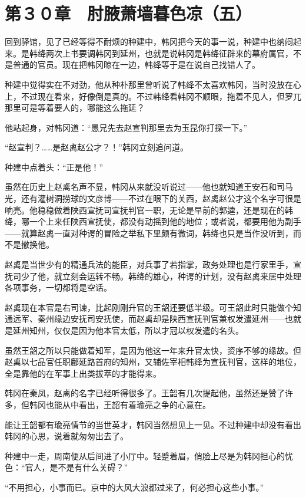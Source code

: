 \section{第３０章　肘腋萧墙暮色凉（五）}

回到驿馆，见了已经等得不耐烦的种建中，韩冈把今天的事一说，种建中也纳闷起来。是韩绛两次上书要调韩冈到延州，也就是说韩冈是韩绛征辟来的幕府属官，不是普通的官员。现在把韩冈晾在一边，韩绛等于是在说自己找错人了。

种建中觉得实在不对劲，他从种朴那里曾听说了韩绛不太喜欢韩冈，当时没放在心上，不过现在看来，好像倒是真的。不过韩绛看韩冈不顺眼，拖着不见人，但罗兀那里可是等着要人的，哪能这么拖延？

他站起身，对韩冈道：“愚兄先去赵宣判那里去为玉昆你打探一下。”

“赵宣判？……是赵禼赵公才？！”韩冈立刻追问道。

种建中点着头：“正是他！”

虽然在历史上赵禼名声不显，韩冈从来就没听说过——他也就知道王安石和司马光，还有灌树洞捞球的文彦博——不过在眼下的关西，赵禼赵公才这个名字可很是响亮。他稳稳做着陕西宣抚司宣抚判官一职，无论是早前的郭逵，还是现在的韩绛，哪一个上来任陕西宣抚使，都没有动摇到他的地位；或者说，都要用他为副手——就算赵禼一直对种谔的冒险之举私下里颇有微词，韩绛也只是当作没听到，而不是撤换他。

赵禼是当世少有的精通兵法的能臣，对兵事了若指掌，政务处理也是行家里手，宣抚司少了他，就立刻会运转不畅。韩绛的雄心，种谔的计划，没有赵禼来居中处理各项事务，一切都将是空话。

赵禼现在本官是右司谏，比起刚刚升官的王韶还要低半级。可王韶此时只能做个知通远军、秦州缘边安抚司安抚使，而赵禼却是陕西宣抚判官兼权发遣延州——也就是延州知州，仅仅是因为他本官太低，所以才冠以权发遣的名头。

虽然王韶之所以只能做着知军，是因为他这一年来升官太快，资序不够的缘故。但赵禼以七品官任职鄜延路首府的知州，又辅佐宰相韩绛为宣抚判官，这样的地位，全是靠他的在军事上出类拔萃的才能得来。

韩冈在秦凤，赵禼的名字已经听得很多了。王韶有几次提起他，虽然还是赞了许多，但韩冈也能从中看出，王韶有着瑜亮之争的心意在。

能让王韶都有瑜亮情节的当世英才，韩冈当然想见上一见。不过种建中却没有看出韩冈的心思，说着就匆匆出去了。

种建中一走，周南便从后间进了小厅中。轻蹙着眉，俏脸上尽是为韩冈担心的忧色：“官人，是不是有什么关碍？”

“不用担心，小事而已。京中的大风大浪都过来了，何必担心这些小事。”


